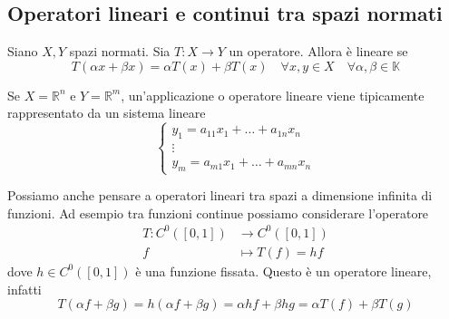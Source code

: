 \subsection{Operatori lineari e continui tra spazi normati}
\begin{definition}
    Siano \(X, Y\) spazi normati. Sia \(T : X \to Y\) un operatore. Allora è
    lineare se 
    \[
      T{(\alpha x + \beta x )} = \alpha T{(x)} + \beta T{(x)} \quad \forall x, y
      \in X \quad \forall \alpha, \beta \in \mathbb{K}
    \]
\end{definition}
\begin{example}
    Se \(X = \mathbb{R}^{n}\) e \(Y = \mathbb{R}^{m}\), un'applicazione o
    operatore lineare viene tipicamente rappresentato da un sistema lineare 
    \begin{equation}\label{eq:sistema_lineare}
        \begin{cases}
            y_1 = a_{11}x_1 + \ldots + a_{1n}x_n \\
            \vdots \\
            y_m = a_{m1}x_1 + \ldots + a_{mn}x_n
        \end{cases}
    \end{equation}
\end{example}
Possiamo anche pensare a operatori lineari tra spazi a dimensione infinita di
funzioni. Ad esempio tra funzioni continue possiamo considerare l'operatore 
  \begin{align*}
      T: C^{0}{([0, 1])} &\longrightarrow C^{0}{([0,1])} \\
      f &\longmapsto T(f) = hf
  \end{align*}
dove \(h \in C^{0}{([0, 1])}\) è una funzione fissata. Questo è un operatore
lineare, infatti
\[
    T{(\alpha f + \beta g)} = h{(\alpha f + \beta g)} = \alpha hf + \beta hg =
    \alpha T{(f)} + \beta T{(g)}
\]

